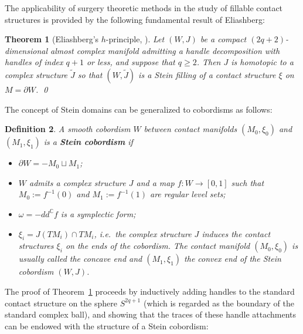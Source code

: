 \documentclass[12pt]{amsart}
\newtheorem{Theorem}{Theorem}[section]
\newtheorem{Definition}[Theorem]{Definition}
\theoremstyle{remark}
\begin{document}
The applicability of surgery theoretic methods in the study of
fillable contact structures is provided by the following fundamental
result of Eliashberg:

\begin{Theorem}[Eliashberg's $h$-principle, \cite{Cieliebak&Eliashberg12, Eliashberg??}]
\label{thm:h-principle}
	Let $(W,J)$ be a compact $(2q{+}2)$-di\-men\-si\-o\-nal almost complex
        manifold admitting a handle decomposition with handles of index $q{+}1$ or less, and
        suppose that $q\geq 2$.  Then $J$ is homotopic to a complex
        structure $\widetilde{J}$ so that $(W,\widetilde{J})$ is a Stein
        filling of a contact structure $\xi$ on $M = \partial W$. \qed
\end{Theorem}

The concept of Stein domains can be generalized to 
cobordisms as follows:

\begin{Definition}
A smooth cobordism $W$ between contact 
manifolds $(M_0, \xi _0)$ and $(M_1, \xi _1)$ is a \textbf{Stein cobordism}
if 
\begin{itemize}
\item $\partial W=-M_0 \sqcup M_1$;
\item $W$ admits a complex structure $J$ and a map $f\colon W\to [0,1]$ such that 
$M_0 :=f^{-1}(0)$ and $M_1:=f^{-1}(1)$ are regular level sets;
\item $\omega =-dd^{\mathbb {C}}f$ is a symplectic form;
\item $\xi_i = J(TM_i)\cap TM_i$, i.e.\ the complex structure $J$ 
induces the contact structures $\xi _i$ on the ends of the cobordism. 
The contact
manifold $(M_0,\xi _0)$ is usually called the \emph{concave} end and
$(M_1, \xi _1)$ the \emph{convex} end of the Stein cobordism $(W, J)$.
\end{itemize}
\end{Definition}


The proof of  
Theorem~\ref{thm:h-principle} proceeds by inductively adding handles to the standard
contact structure on the sphere $S^{2q{+}1}$ (which is regarded as the 
boundary of the standard complex ball), and showing that the traces of these
handle attachments can be endowed with the structure of a Stein cobordism:
\end{document}
